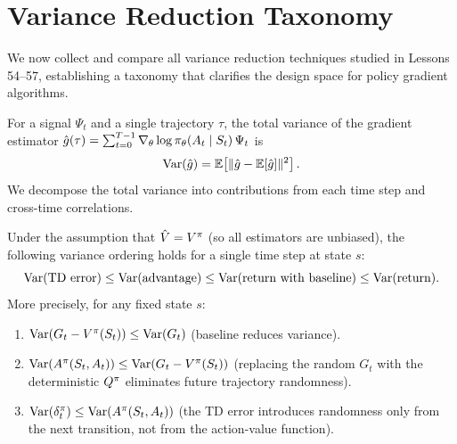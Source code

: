 \documentclass[11pt,a4paper]{article}
\begin{document}
\section{Variance Reduction Taxonomy}

We now collect and compare all variance reduction techniques studied
in Lessons 54--57, establishing a taxonomy that clarifies the design
space for policy gradient algorithms.

\begin{definition}
\label{def:var-estimator}
For a signal $\Psi_t$ and a single trajectory $\tau$, the total
variance of the gradient estimator $\hat{g}(\tau) = \sum_{t=0}^{T-1}
\nabla_\theta \log \pi_\theta(A_t \mid S_t)\, \Psi_t$ is
\[
  \operatorname{Var}(\hat{g}) = \mathbb{E}\!\left[\|\hat{g} - \mathbb{E}[\hat{g}]\|^2\right].
\]
We decompose the total variance into contributions from each time
step and cross-time correlations.
\end{definition}

\begin{theorem}
\label{thm:variance-ordering}
Under the assumption that $\hat{V} = V^{\pi}$ (so all estimators are
unbiased), the following variance ordering holds for a single time step
at state $s$:
\[
  \operatorname{Var}(\text{TD error}) \leq \operatorname{Var}(\text{advantage}) \leq
  \operatorname{Var}(\text{return with baseline}) \leq \operatorname{Var}(\text{return}).
\]
More precisely, for any fixed state $s$:
\begin{enumerate}[label=(\roman*)]
  \item $\operatorname{Var}(G_t - V^{\pi}(S_t)) \leq \operatorname{Var}(G_t)$ (baseline reduces
    variance).
  \item $\operatorname{Var}(A^\pi(S_t, A_t)) \leq \operatorname{Var}(G_t - V^{\pi}(S_t))$
    (replacing the random $G_t$ with the deterministic $Q^{\pi}$
    eliminates future trajectory randomness).
  \item $\operatorname{Var}(\delta_t^\pi) \leq \operatorname{Var}(A^\pi(S_t, A_t))$
    (the TD error introduces randomness only from the next transition,
    not from the action-value function).
\end{enumerate}
\end{theorem}
\end{document}
